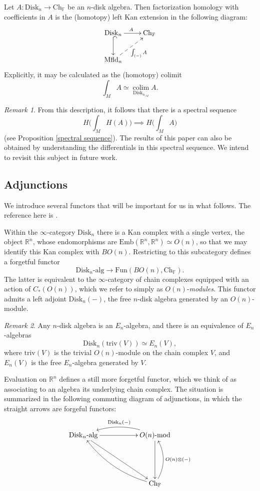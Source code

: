 \documentclass{compositio}
\theoremstyle{definition}\newtheorem{definition}{Definition}[section]
\theoremstyle{theorem}\newtheorem{lemma}[definition]{Lemma}
\theoremstyle{remark}\newtheorem*{conventions}{Conventions}
\theoremstyle{remark}\newtheorem*{acknowledgments}{Acknowledgments}
\theoremstyle{remark}\newtheorem*{outline}{Outline}
\theoremstyle{remark}\newtheorem*{questions}{Questions}
\theoremstyle{remark}\newtheorem{example}[definition]{Example}
\theoremstyle{definition}\newtheorem{construction}[definition]{Construction}
\theoremstyle{definition}\newtheorem*{convention}{Convention}
\theoremstyle{definition}\newtheorem*{conjecture}{Conjecture}
\theoremstyle{theorem}\newtheorem{theorem}[definition]{Theorem}
\theoremstyle{theorem}\newtheorem{paradigm}[definition]{Paradigm}
\theoremstyle{remark}\newtheorem{remark}[definition]{Remark}
\theoremstyle{corollary}\newtheorem{corollary}[definition]{Corollary}
\theoremstyle{theorem}\newtheorem{proposition}[definition]{Proposition}
\theoremstyle{definition}\newtheorem{question}[definition]{Question}
\begin{document}
Let $A:{\mathrm{Disk}}_n\to {\mathrm{Ch}}_\mathbb{F}$ be an $n$-disk algebra. Then factorization homology with coefficients in $A$ is the (homotopy) left Kan extension in the following diagram:
$$\xymatrix{
{\mathrm{Disk}}_n\ar[r]^A\ar@{^{(}->}[d] &{\mathrm{Ch}}_\mathbb{F}\\
{\mathrm{Mfld}}_n \ar@{-->}[ur]_{\int_{(-)}A}
}$$ Explicitly, it may be calculated as the (homotopy) colimit $$\int_MA\simeq \operatorname*{\mathrm{colim}}_{{\mathrm{Disk}}_{n_{/M}}}A.$$

\begin{remark}\label{spectral sequence remark}
From this description, it follows that there is a spectral sequence $$H\bigg(\int_MH(A)\bigg)\implies H\bigg(\int_MA\bigg)$$ (see Proposition \ref{spectral sequence}). The results of this paper can also be obtained by understanding the differentials in this spectral sequence. We intend to revisit this subject in future work.
\end{remark}

\subsection{Adjunctions} We introduce several functors that will be important for us in what follows. The reference here is \cite{AF}.

Within the $\infty$-category ${\mathrm{Disk}}_n$ there is a Kan complex with a single vertex, the object $\mathbb{R}^n$, whose endomorphisms are ${\mathrm{Emb}}(\mathbb{R}^n,\mathbb{R}^n)\simeq O(n)$, so that we may identify this Kan complex with $BO(n)$. Restricting to this subcategory defines a forgetful functor $${\mathrm{Disk}}_n\text{-}\mathrm{alg}\to \mathrm{Fun}(BO(n),{\mathrm{Ch}}_\mathbb{F}).$$ The latter is equivalent to the $\infty$-category of chain complexes equipped with an action of $C_*(O(n))$, which we refer to simply as $O(n)$-\emph{modules}. This functor admits a left adjoint ${\mathrm{Disk}}_n(-)$, the free $n$-disk algebra generated by an $O(n)$-module. 

\begin{remark}
Any $n$-disk algebra is an $E_n$-algebra, and there is an equivalence of $E_n$-algebras $${\mathrm{Disk}}_n(\mathrm{triv}(V))\simeq E_n(V),$$ where $\mathrm{triv}(V)$ is the trivial $O(n)$-module on the chain complex $V$, and $E_n(V)$ is the free $E_n$-algebra generated by $V$.
\end{remark}

Evaluation on $\mathbb{R}^n$ defines a still more forgetful functor, which we think of as associating to an algebra its underlying chain complex. The situation is summarized in the following commuting diagram of adjunctions, in which the straight arrows are forgeful functors:
$$\xymatrix{
{\mathrm{Disk}}_n\text{-}\mathrm{alg}\ar[rr]\ar[ddrr]&&O(n)\text{-}\mathrm{mod}\ar@/_1pc/[ll]_{{\mathrm{Disk}}_n(-)}\ar[dd]\\\\
&&{\mathrm{Ch}}_\mathbb{F}\ar@/_1pc/[uu]_{O(n)\otimes(-)}\ar@/^1pc/[uull]
}$$
\end{document}
